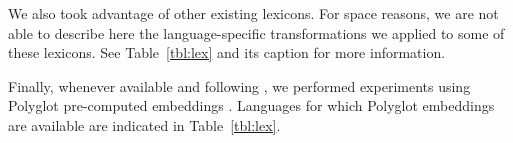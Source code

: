 \documentclass[11pt,letterpaper]{article}
\begin{document}
We also took advantage of other existing lexicons. For space reasons, we are not able to describe here the language-specific
transformations we applied to some of these lexicons. See Table~\ref{tbl:lex} and its caption for more information.


Finally, whenever available and following \citet{plank16}, we performed experiments using Polyglot pre-computed
embeddings \cite{alrfou13}. Languages for which Polyglot embeddings are available are indicated in Table~\ref{tbl:lex}.

\end{document}
